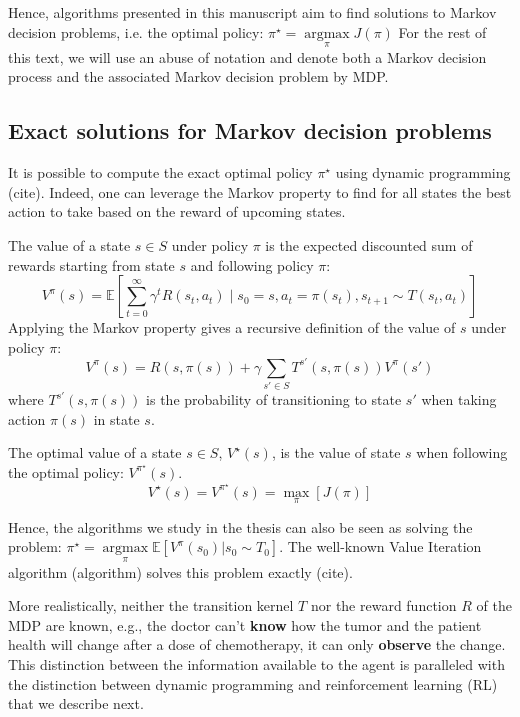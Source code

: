 Hence, algorithms presented in this manuscript aim to find solutions to Markov decision problems, i.e. the optimal policy: $\pi^\star =\underset{\pi}{\operatorname{argmax}}J(\pi)$
For the rest of this text, we will use an abuse of notation and denote both a Markov decision process and the associated Markov decision problem by MDP.
\subsection{Exact solutions for Markov decision problems}
It is possible to compute the exact optimal policy $\pi^\star$ using dynamic programming (cite). Indeed, one can leverage the Markov property to find for all states the best action to take based on the reward of upcoming states.
\begin{definition} The value of a state $s\in S$ under policy $\pi$ is the expected discounted sum of rewards starting from state $s$ and following policy $\pi$:
    $$V^\pi(s) = \mathbb{E}\left[\sum_{t=0}^{\infty} \gamma^t R(s_t, a_t) \mid s_0 = s, a_t = \pi(s_t), s_{t+1} \sim T(s_t, a_t)\right]$$
    Applying the Markov property gives a recursive definition of the value of $s$ under policy $\pi$:
    $$V^\pi(s) = R(s,\pi(s)) + \gamma \sum_{s' \in S} T^{s'}(s,\pi(s))V^\pi(s')$$
    where $T^{s'}(s,\pi(s))$ is the probability of transitioning to state $s'$ when taking action $\pi(s)$ in state $s$.
\end{definition}
\begin{definition} The optimal value of a state $s\in S$, $V^\star(s)$, is the value of state $s$ when following the optimal policy: $V^{\pi^{\star}}(s)$.
    $$V^{\star}(s) = V^{\pi^{\star}}(s) = \underset{\pi}{\max}\left[J(\pi)\right]$$
\end{definition}
Hence, the algorithms we study in the thesis can also be seen as solving the problem: $\pi^{\star} = \underset{\pi}{\operatorname{argmax}}\mathbb{E}\left[V^{\pi}(s_0)|s_0\sim T_0 \right]$. The well-known Value Iteration algorithm (algorithm) solves this problem exactly (cite). 

More realistically, neither the transition kernel $T$ nor the reward function $R$ of the MDP are known, e.g., the doctor can't \textbf{know} how the tumor and the patient health will change after a dose of chemotherapy, it can only \textbf{observe} the change. This distinction between the information available to the agent is paralleled with the distinction between dynamic programming and reinforcement learning (RL) that we describe next. 
